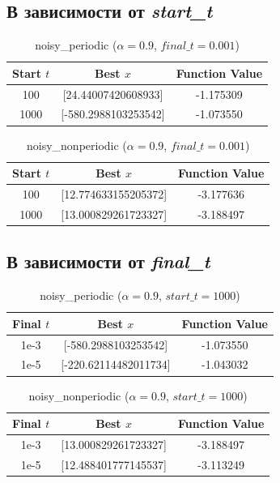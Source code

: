 \documentclass{article}
\begin{document}
\subsection{В зависимости от \textit{start\_t}}
\begin{table}[H]
\centering
\begin{tabular}{|c|c|c|}
\hline
\textbf{Start $t$} & \textbf{Best $x$} & \textbf{Function Value} \\
\hline
100 & [24.44007420608933] & -1.175309 \\
1000 & [-580.2988103253542] & -1.073550 \\
\hline
\end{tabular}
\caption{noisy\_periodic ($\alpha=0.9$, $final\_t=0.001$)}
\end{table}
\begin{table}[H]
\centering
\begin{tabular}{|c|c|c|}
\hline
\textbf{Start $t$} & \textbf{Best $x$} & \textbf{Function Value} \\
\hline
100 & [12.774633155205372] & -3.177636 \\
1000 & [13.000829261723327] & -3.188497 \\
\hline
\end{tabular}
\caption{noisy\_nonperiodic ($\alpha=0.9$, $final\_t=0.001$)}
\end{table}


\subsection{В зависимости от \textit{final\_t}}
\begin{table}[H]
\centering
\begin{tabular}{|c|c|c|}
\hline
\textbf{Final $t$} & \textbf{Best $x$} & \textbf{Function Value} \\
\hline
1e-3 & [-580.2988103253542] & -1.073550 \\
1e-5 & [-220.62114482011734] & -1.043032 \\
\hline
\end{tabular}
\caption{noisy\_periodic ($\alpha=0.9$, $start\_t=1000$)}
\end{table}
\begin{table}[H]
\centering
\begin{tabular}{|c|c|c|}
\hline
\textbf{Final $t$} & \textbf{Best $x$} & \textbf{Function Value} \\
\hline
1e-3 & [13.000829261723327] & -3.188497 \\
1e-5 & [12.488401777145537] & -3.113249 \\
\hline
\end{tabular}
\caption{noisy\_nonperiodic ($\alpha=0.9$, $start\_t=1000$)}
\end{table}
\end{document}
